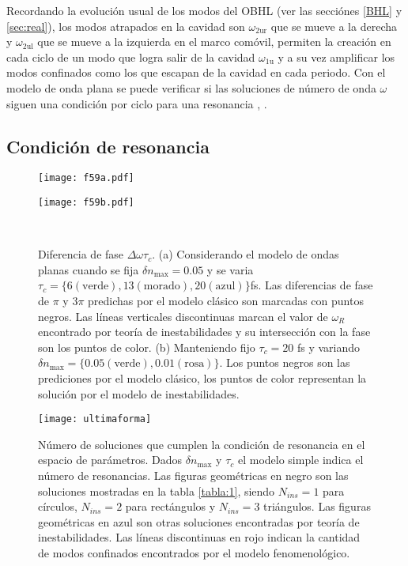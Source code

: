 Recordando la evoluci\'{o}n usual  de los modos del OBHL (ver las secci\'{o}nes \ref{BHL} y \ref{sec:real}), los modos atrapados en la cavidad son $\omega_{\text{2ur}}$ que se mueve a la derecha y $\omega_{\text{2ul}}$ que se mueve a la izquierda en el marco com\'{o}vil, permiten la creaci\'{o}n en cada ciclo de un modo que logra salir de la cavidad $\omega_{\text{1u}}$ y a su vez amplificar los modos  confinados como los que escapan de la cavidad en cada periodo. Con el modelo de onda plana se puede verificar si las soluciones de número de onda
$\omega$ siguen una condición por ciclo para una resonancia \citep{Leonhardt2007}, \citep{GaonaReyes2017}.

\subsection{Condici\'{o}n de resonancia}\label{resonancia}
\begin{center}
\begin{figure}[h]
\begin{minipage}[c]{0.5\textwidth}
\texttt{[image: f59a.pdf]}
  \end{minipage}%
\begin{minipage}[c]{0.5\textwidth}
\texttt{[image: f59b.pdf]}
\end{minipage}\\[2pt]                 
\caption{Diferencia de fase $\Delta \omega \tau_c .$ (a) Considerando el modelo de ondas planas cuando se fija $\delta n_{\text{max}}=0.05$  y se varia $\tau_c=\{6( \text{verde}),13(\text{morado}),20(\text{azul}) \} $fs. Las diferencias de fase de  $\pi$ y $3\pi$ predichas por el modelo cl\'{a}sico son marcadas con puntos negros. Las l\'{i}neas  verticales discontinuas marcan el valor de $\omega_R$ encontrado por teor\'{i}a de inestabilidades y su intersecci\'{o}n con la fase son los puntos de color. (b) Manteniendo fijo $\tau_c=20$ fs y variando $\delta n_{\text{max}}=\{0.05 (\text{verde}),0.01(\text{rosa})\}$. Los puntos negros son las prediciones por el modelo cl\'{a}sico, los puntos de color representan la soluci\'{o}n por el modelo de inestabilidades.}
   \label{fig:5.9}  
\end{figure}
\end{center}
\begin{figure}\centering
	\texttt{[image: ultimaforma]}
	\caption{N\'{u}mero de soluciones que cumplen la condici\'{o}n de resonancia en el espacio de par\'{a}metros. Dados $\delta n_{\text{max}}$ y $\tau_c$ el modelo simple indica el n\'{u}mero de resonancias. Las figuras geom\'etricas en negro son las soluciones mostradas en la tabla \ref{tabla:1}, siendo $N_{ins}=1$ para c\'irculos, $N_{ins}=2$ para rect\'angulos y $N_{ins}=3$ tri\'angulos. Las figuras geom\'etricas en azul son otras soluciones encontradas por teor\'ia de inestabilidades. Las l\'ineas discontinuas en rojo indican la cantidad de modos confinados encontrados por el modelo fenomenol\'ogico.}\label{fig:5.10}
\end{figure}

